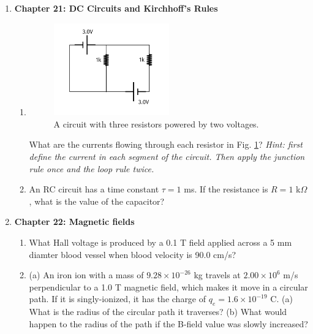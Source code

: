 \documentclass[10pt]{article}
\begin{document}
\begin{enumerate}
\item \textbf{Chapter 21: DC Circuits and Kirchhoff's Rules}
\begin{enumerate}
\item 
\begin{figure}[ht]
\centering
\includegraphics[width=0.5\textwidth]{iV.pdf}
\caption{\label{fig:circuit1} A circuit with three resistors powered by two voltages.}
\end{figure}
What are the currents flowing through each resistor in Fig. \ref{fig:circuit1}? \textit{Hint: first define the current in each segment of the circuit.  Then apply the junction rule once and the loop rule twice.}\\ \vspace{10cm}
\item An RC circuit has a time constant $\tau = 1$ ms.  If the resistance is $R = 1$ k$\Omega$, what is the value of the capacitor? \\ \vspace{1cm}
\end{enumerate}
\item \textbf{Chapter 22: Magnetic fields}
\begin{enumerate}
\item What Hall voltage is produced by a 0.1 T field applied across a 5 mm diamter blood vessel when blood velocity is 90.0 cm/s? \\ \vspace{1cm}
\item (a) An iron ion with a mass of $9.28\times 10^{-26}$ kg travels at $2.00 \times 10^{6}$ m/s perpendicular to a 1.0 T magnetic field, which makes it move in a circular path. If it is singly-ionized, it has the charge of $q_e = 1.6 \times 10^{-19}$ C. (a) What is the radius of the circular path it traverses? (b) What would happen to the radius of the path if the B-field value was slowly increased? \\ \vspace{2cm}

\end{enumerate}
\end{enumerate}
\end{document}
